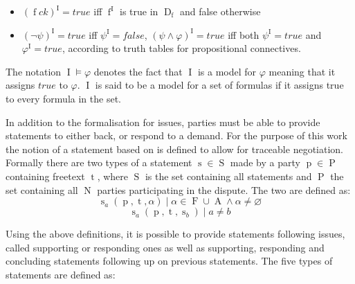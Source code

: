 \documentclass[12pt,msc,a4paper,oneside]{ucl_thesis}
\DeclareMathOperator{\Propatom}{A}
\DeclareMathOperator{\Propvar}{F}
\DeclareMathOperator{\propvar}{f}
\DeclareMathOperator{\Propdom}{D}
\DeclareMathOperator{\Interpretation}{I}
\DeclareMathOperator{\Statement}{S}
\DeclareMathOperator{\statement}{s}
\DeclareMathOperator{\statementtext}{t}
\DeclareMathOperator{\Party}{P}
\DeclareMathOperator{\party}{p}
\DeclareMathOperator{\Numparties}{N}
\begin{document}
\begin{itemize}
        \begin{itemize}
            \item $(\propvar ck)^{\Interpretation} = true$ iff $\propvar^{\Interpretation}$ is true in $\Propdom_{\propvar}$ and false otherwise
            \item $(\neg\psi)^{\Interpretation} = true$ iff $\psi^{\Interpretation} = false$, $(\psi\wedge\varphi)^{\Interpretation} = true$ iff both $\psi^{\Interpretation} = true$ and $\varphi^{\Interpretation} = true$, according to truth tables for propositional connectives.
        \end{itemize}

        The notation $\Interpretation\models\varphi$ denotes the fact that $\Interpretation$ is a model for $\varphi$ meaning that it assigns $true$ to $\varphi$. $\Interpretation$ is said to be a model for a set of formulas if it assigns true to every formula in the set.
\end{itemize}


In addition to the formalisation for issues, parties must be able to provide statements to either back, or respond to a demand. For the purpose of this work the notion of a statement based on \cite{Bellucci:2004:IAI:1032651.1033678} is defined to allow for traceable negotiation. Formally there are two types of a statement $\statement \in \Statement$ made by a party $\party \in \Party$ containing freetext $\statementtext$, where $\Statement$ is the set containing all statements and $\Party$ the set containing all $\Numparties$ parties participating in the dispute. The two are defined as:
\begin{equation}
    \statement_a(\party, \statementtext, \alpha) \mid \alpha \in \Propvar \cup \Propatom \wedge \alpha \neq \varnothing
    \label{eq:initial_statement}
\end{equation}
\begin{equation}
    \statement_a(\party, \statementtext, \statement_b) \mid a \neq b
\end{equation}

Using the above definitions, it is possible to provide statements following issues, called supporting or responding ones as well as supporting, responding and concluding statements following up on previous statements. The five types of statements are defined as:
\end{document}
